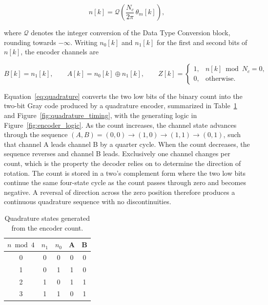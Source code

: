 \begin{equation}
	n[k] = \mathcal{Q}\!\left( \frac{N_c}{2\pi}\, \theta_m[k] \right),
	\label{eq:enc_count}
\end{equation}

where $\mathcal{Q}$ denotes the integer conversion of the Data Type Conversion block, rounding towards $-\infty$. Writing $n_0[k]$ and $n_1[k]$ for the first and second bits of $n[k]$, the encoder channels are

\begin{equation}
	B[k] = n_1[k], \qquad
	A[k] = n_0[k] \oplus n_1[k], \qquad
	Z[k] =
	\begin{cases}
		1, & n[k] \bmod N_c = 0, \\
		0, & \text{otherwise}.
	\end{cases}
	\label{eq:quadrature}
\end{equation}

Equation~\eqref{eq:quadrature} converts the two low bits of the binary count into the two-bit Gray code produced by a quadrature encoder, summarized in Table~\ref{tab:quad_states} and Figure~\ref{fig:quadrature_timing}, with the generating logic in Figure~\ref{fig:encoder_logic}. As the count increases, the channel state advances through the sequence $(A,B) = (0,0) \rightarrow (1,0) \rightarrow (1,1) \rightarrow (0,1)$, such that channel A leads channel B by a quarter cycle. When the count decreases, the sequence reverses and channel B leads. Exclusively one channel changes per count, which is the property the decoder relies on to determine the direction of rotation. The count is stored in a two's complement form where the two low bits continue the same four-state cycle as the count passes through zero and becomes negative. A reversal of direction across the zero position therefore produces a continuous quadrature sequence with no discontinuities.

\begin{table}[htbp]
	\centering
	\caption{Quadrature states generated from the encoder count.}
	\vspace{4pt}
	\label{tab:quad_states}
	\begin{tabular}{ccccc}
		\hline
		$n \bmod 4$ & $n_1$ & $n_0$ & A & B \\
		\hline
		0 & 0 & 0 & 0 & 0 \\
		1 & 0 & 1 & 1 & 0 \\
		2 & 1 & 0 & 1 & 1 \\
		3 & 1 & 1 & 0 & 1 \\
		\hline
	\end{tabular}
\end{table}

